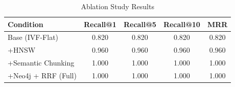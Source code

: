 \begin{table}[h]
\centering
\caption{Ablation Study Results}
\label{tab:ablation}
\begin{tabular}{|l|c|c|c|c|}
\hline
\textbf{Condition} & \textbf{Recall@1} & \textbf{Recall@5} & \textbf{Recall@10} & \textbf{MRR} \\
\hline
Base (IVF-Flat) & 0.820 & 0.820 & 0.820 & 0.820 \\
+HNSW & 0.960 & 0.960 & 0.960 & 0.960 \\
+Semantic Chunking & 1.000 & 1.000 & 1.000 & 1.000 \\
+Neo4j + RRF (Full) & 1.000 & 1.000 & 1.000 & 1.000 \\
\hline
\end{tabular}
\end{table}